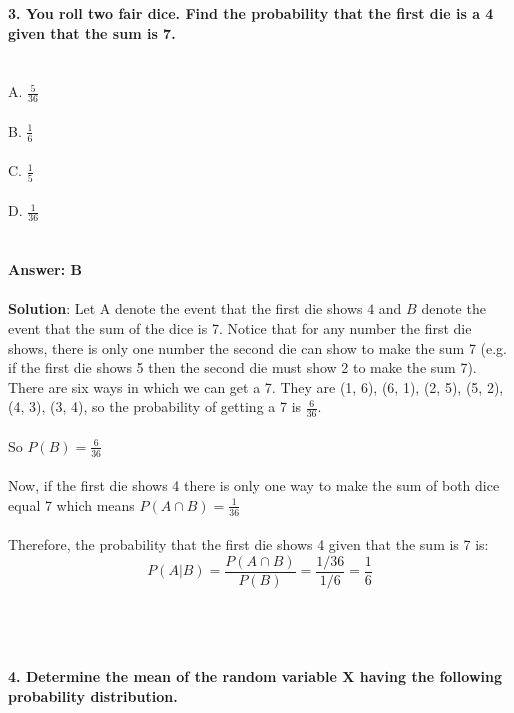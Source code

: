 \documentclass[prl,twocolumn,showpacs,preprintnumbers,superscriptaddress]{revtex4}
\theoremstyle{plain}
\theoremstyle{definition}
\begin{document}
\begin{widetext}
\textbf{3. You roll two fair dice. Find the probability that the first die is a 4 given that the sum is 7.}
\\
\\
\\
A. $\frac{5}{36}$\\
\\
B. $\frac{1}{6}$\\
\\
C. $\frac{1}{5}$\\
\\
D. $\frac{1}{36}$
\\
\\
\\
\textbf{Answer: B}
\\
\\
\textbf{Solution}:
Let A denote the event that the first die shows $4$ and $B$ denote the event that the sum of the dice is 7.
Notice that for any number the first die shows, there is only one number the second die can show to make
the sum 7 (e.g. if the first die shows 5 then the second die must show 2 to make the sum 7). There are six ways in which we can get a 7. They are {(1, 6), (6, 1), (2, 5), (5, 2), (4, 3), (3, 4)}, so the probability of getting a 7 is $\frac{6}{36}.$
\\
\\
So $P(B) = \frac{6}{36}$ 
\\
\\
Now, if the first die shows 4 there is only one way to make the sum of both dice equal 7 which means $P(A\cap B) = \frac{1}{36}$
\\
\\
Therefore, the probability that the first die shows 4 given that the sum is 7 is:
\begin{equation}
P(A|B) = \frac{P(A\cap B)}{P(B)} = \frac{1/36}{1/6} = \frac{1}{6} {}\nonumber
\end{equation}
\\
\\
\\
\newpage
\\
\noindent\textbf{4. Determine the mean of the random variable X having the following probability distribution.}
\\
\\
\begin{center}
\begin{tabular}{|c|c|c|c|c|c|c|c|c|c|c|}

\end{tabular}
\end{center}
\end{widetext}
\end{document}
